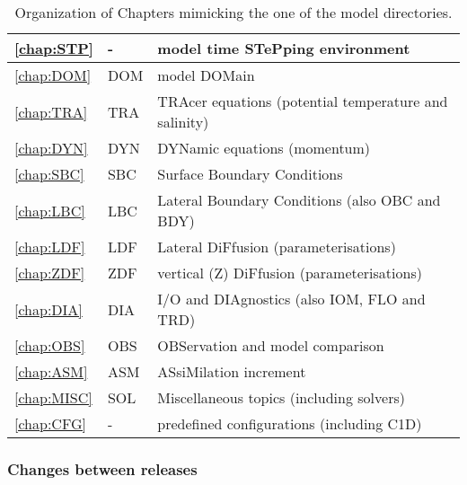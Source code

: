 \documentclass[../main/NEMO_manual]{subfiles}
\begin{document}
\begin{table}[!t]	
  \caption{
    \protect\label{tab:chapters}
    Organization of Chapters mimicking the one of the model directories.
  }
  \begin{center}
    \begin{tabular}{|l|l|l|}
      \hline
      \autoref{chap:STP}  & -   & model time STePping environment \\
      \hline
      \autoref{chap:DOM}  & DOM & model DOMain \\
      \hline
      \autoref{chap:TRA}  & TRA & TRAcer equations (potential temperature and salinity) \\
      \hline
      \autoref{chap:DYN}  & DYN & DYNamic equations (momentum) \\
      \hline
      \autoref{chap:SBC}  & SBC & Surface Boundary Conditions \\
      \hline
      \autoref{chap:LBC}  & LBC & Lateral Boundary Conditions (also OBC and BDY)  \\
      \hline
      \autoref{chap:LDF}  & LDF & Lateral DiFfusion (parameterisations) \\
      \hline
      \autoref{chap:ZDF}  & ZDF & vertical (Z) DiFfusion (parameterisations)  \\
      \hline
      \autoref{chap:DIA}  & DIA & I/O and DIAgnostics (also IOM, FLO and TRD) \\
      \hline
      \autoref{chap:OBS}  & OBS & OBServation and model comparison  \\
      \hline
      \autoref{chap:ASM}  & ASM & ASsiMilation increment  \\
      \hline
      \autoref{chap:MISC} & SOL & Miscellaneous  topics (including solvers)  \\
      \hline
      \autoref{chap:CFG}  & -   & predefined configurations (including C1D) \\
      \hline
    \end{tabular}
  \end{center}
\end{table}

\subsubsection{Changes between releases}
\end{document}
